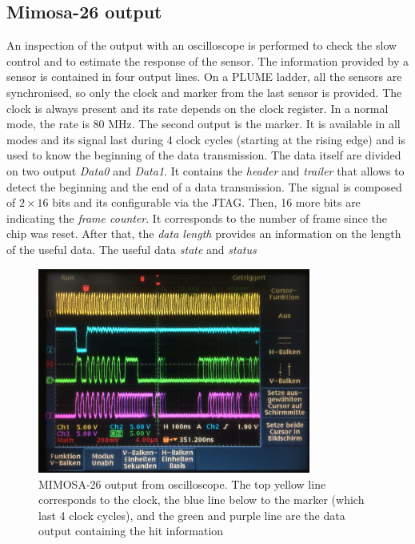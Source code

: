   \subsection{Mimosa-26 output}

  An inspection of the output with an oscilloscope is performed to check the slow control and to estimate the response of the sensor.
  The information provided by a sensor is contained in four output lines.
  On a PLUME ladder, all the sensors are synchronised, so only the clock and marker from the last sensor is provided.
  The clock is always present and its rate depends on the clock register. 
  In a normal mode, the rate is 80 MHz.
  The second output is the marker. 
  It is available in all modes and its signal last during 4 clock cycles (starting at the rising edge) and is used to know the beginning of the data transmission.
  The data itself are divided on two output \textit{Data0} and \textit{Data1}. 
  It contains the \textit{header} and \textit{trailer} that allows to detect the beginning and the end of a data transmission.
  The signal is composed of $2 \times 16$ bits and its configurable via the \gls{JTAG}.
  Then, 16 more bits are indicating the \textit{frame counter}.
  It corresponds to the number of frame since the chip was reset.
  After that, the \textit{data length} provides an information on the length of the useful data.
  The useful data \textit{state} and \textit{status}

  \begin{figure}[h]
    \centering
    \includegraphics[width=0.8\textwidth]{Pictures/labTests/mi26_output}
    \caption{MIMOSA-26 output from oscilloscope. The top yellow line corresponds to the clock, the blue line below to the marker (which last 4 clock cycles), and the green and purple line are the data output containing the hit information}
    \label{fig:mi26Output}
  \end{figure}

